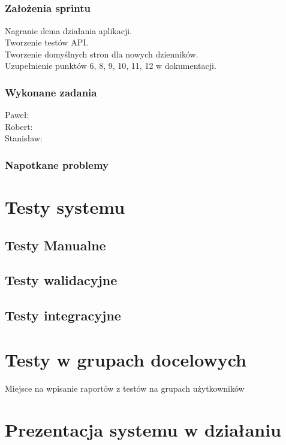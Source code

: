 \documentclass[a4paper,11pt]{report}
\begin{document}
\section {}
\subsection {Założenia sprintu}
Nagranie dema działania aplikacji.\\
Tworzenie testów API.\\
Tworzenie domyślnych stron dla nowych dzienników.\\
Uzupełnienie punktów 6, 8, 9, 10, 11, 12 w dokumentacji.\\
\subsection {Wykonane zadania}
Paweł: \\
Robert: \\
Stanisław: \\
\subsection {Napotkane problemy}


\chapter {Testy systemu}
\section{Testy Manualne}
\section{Testy walidacyjne}
\section{Testy integracyjne}


\chapter {Testy w grupach docelowych}
Miejsce na wpisanie raportów z testów na grupach użytkowników

\chapter{Prezentacja systemu w działaniu}
\end{document}
